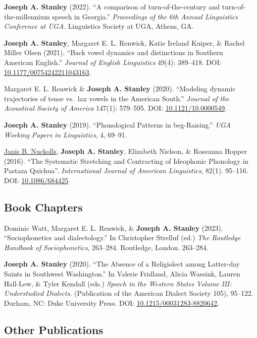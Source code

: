 \documentclass[
]{article}
\begin{document}
\textbf{Joseph A. Stanley} (2022). ``A comparison of turn-of-the-century
and turn-of-the-millennium speech in Georgia.'' \emph{Proceedings of the
6th Annual Linguistics Conference at UGA.} Linguistics Society at UGA,
Athens, GA.

\textbf{Joseph A. Stanley}, Margaret E. L. Renwick, Katie Ireland
Kuiper, \& Rachel Miller Olsen (2021). ``Back vowel dynamics and
distinctions in Southern American English.'' \emph{Journal of English
Linguistics} 49(4): 389--418. DOI:
\href{https://doi.org/10.1177/00754242211043163}{10.1177/00754242211043163}.

Margaret E. L. Renwick \& \textbf{Joseph A. Stanley} (2020). ``Modeling
dynamic trajectories of tense vs.~lax vowels in the American South.''
\emph{Journal of the Acoustical Society of America} 147(1): 579--595.
DOI:
\href{https://asa.scitation.org/doi/10.1121/10.0000549}{10.1121/10.0000549}.

\textbf{Joseph A. Stanley} (2019). ``Phonological Patterns in
beg-Raising.'' \emph{UGA Working Papers in Linguistics}, 4, 69--91.

\href{https://hum.byu.edu/directory/janis-nuckolls}{Janis B. Nuckolls},
\textbf{Joseph A. Stanley}, Elizabeth Nielson, \& Roseanna Hopper
(2016). ``The Systematic Stretching and Contracting of Ideophonic
Phonology in Pastaza Quichua''. \emph{International Journal of American
Linguistics}, 82(1). 95--116. DOI:
\href{http://dx.doi.org/10.1086/684425}{10.1086/684425}

\hypertarget{book-chapters}{%
\subsection{Book Chapters}\label{book-chapters}}

Dominic Watt, Margaret E. L. Renwick, \& \textbf{Joseph A. Stanley}
(2023). ``Sociophonetics and dialectology.'' In Christopher Strelluf
(ed.) \emph{The Routledge Handbook of Sociophonetics}, 263--284.
Routledge, London. 263--284.

\textbf{Joseph A. Stanley} (2020). ``The Absence of a Religiolect among
Latter-day Saints in Southwest Washington.'' In Valerie Fridland, Alicia
Wassink, Lauren Hall-Lew, \& Tyler Kendall (eds.) \emph{Speech in the
Western States Volume III: Understudied Dialects.} (Publication of the
American Dialect Society 105), 95--122. Durham, NC: Duke University
Press. DOI:
\href{https://doi.org/10.1215/00031283-8820642}{10.1215/00031283-8820642}.

\hypertarget{other-publications}{%
\subsection{Other Publications}\label{other-publications}}
\end{document}
